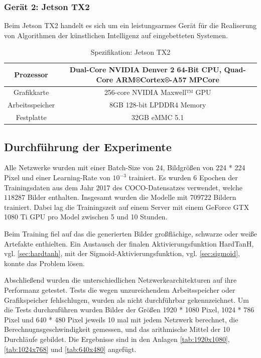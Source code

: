 \subsubsection{Gerät 2: Jetson TX2}

Beim Jetson TX2 handelt es sich um ein leistungsarmes Gerät für die Realiserung von Algorithmen der künstlichen Intelligenz auf eingebetteten Systemen.

\begin{table}[H]
    \centering
    \begin{tabular}{ |c|c| }
        \hline
        Prozessor       & Dual-Core NVIDIA Denver 2 64-Bit CPU, Quad-Core ARM®Cortex®-A57 MPCore \\ \hline
        Grafikkarte     & 256-core NVIDIA Maxwell™ GPU \\ \hline
        Arbeitsspeicher & 8GB 128-bit LPDDR4 Memory  \\ \hline
        Festplatte      & 32GB eMMC 5.1 \\ \hline
    \end{tabular}
    \caption{Spezifikation: Jetson TX2}
    \label{tab:jetson_tx1}
\end{table}

\subsection{Durchführung der Experimente}

Alle Netzwerke wurden mit einer Batch-Size von $ 24 $, Bildgrößen von 224 * 224 Pixel und einer Learning-Rate von $ 10^{-3} $ trainiert. Es wurden 6 Epochen der Trainingsdaten aus dem Jahr 2017 des COCO-Datensatzes verwendet, welche $ 118287 $ Bilder enthalten. Insgesamt wurden die Modelle mit $ 709722 $ Bildern trainiert. Dabei lag die Trainingszeit auf einem Server mit einem GeForce GTX 1080 Ti GPU pro Model zwischen 5 und 10 Stunden.

Beim Training fiel auf das die generierten Bilder großflächige, schwarze oder weiße Artefakte enthielten. Ein Austausch der finalen Aktivierungsfunktion HardTanH, vgl. \ref{sec:hardtanh}, mit der Sigmoid-Aktivierungsfunktion, vgl. \ref{sec:sigmoid}, konnte das Problem lösen.

Abschließend wurden die unterschiedlichen Netzwerkearchitekturen auf ihre Performanz getestet. Tests die wegen unzureichendem Arbeitsspeicher oder Grafikspeicher fehlschlugen, wurden als \textcolor{danger}{nicht durchführbar} gekennzeichnet. Um die Tests durchzuführen wurden Bilder der Größen 1920 * 1080 Pixel, 1024 * 786 Pixel und 640 * 480 Pixel jeweils 10 mal mit jedem Netzwerk berechnet, die Berechnugnsgeschwindigkeit gemessen, und das arithmische Mittel der 10 Durchläufe gebildet. Die Ergebnisse sind in den Anlagen \ref{tab:1920x1080}, \ref{tab:1024x768} und \ref{tab:640x480} angefügt.

